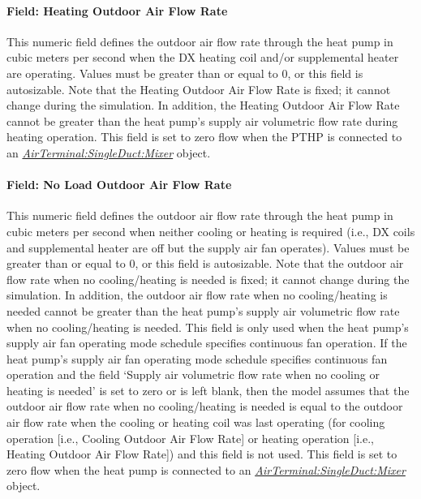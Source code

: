 \paragraph{Field: Heating Outdoor Air Flow Rate}\label{field-heating-outdoor-air-flow-rate-1}

This numeric field defines the outdoor air flow rate through the heat pump in cubic meters per second when the DX heating coil and/or supplemental heater are operating. Values must be greater than or equal to 0, or this field is autosizable. Note that the Heating Outdoor Air Flow Rate is fixed; it cannot change during the simulation. In addition, the Heating Outdoor Air Flow Rate cannot be greater than the heat pump's supply air volumetric flow rate during heating operation. This field is set to zero flow when the PTHP is connected to an \textit{\hyperref[airterminalsingleductmixer]{AirTerminal:SingleDuct:Mixer}} object.

\paragraph{Field: No Load Outdoor Air Flow Rate}\label{field-no-load-outdoor-air-flow-rate-1}

This numeric field defines the outdoor air flow rate through the heat pump in cubic meters per second when neither cooling or heating is required (i.e., DX coils and supplemental heater are off but the supply air fan operates). Values must be greater than or equal to 0, or this field is autosizable. Note that the outdoor air flow rate when no cooling/heating is needed is fixed; it cannot change during the simulation. In addition, the outdoor air flow rate when no cooling/heating is needed cannot be greater than the heat pump's supply air volumetric flow rate when no cooling/heating is needed. This field is only used when the heat pump's supply air fan operating mode schedule specifies continuous fan operation. If the heat pump's supply air fan operating mode schedule specifies continuous fan operation and the field `Supply air volumetric flow rate when no cooling or heating is needed' is set to zero or is left blank, then the model assumes that the outdoor air flow rate when no cooling/heating is needed is equal to the outdoor air flow rate when the cooling or heating coil was last operating (for cooling operation {[}i.e., Cooling Outdoor Air Flow Rate{]} or heating operation {[}i.e., Heating Outdoor Air Flow Rate{]}) and this field is not used. This field is set to zero flow when the heat pump is connected to an \textit{\hyperref[airterminalsingleductmixer]{AirTerminal:SingleDuct:Mixer}} object.

